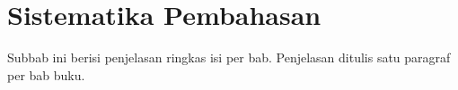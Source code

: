 \section{Sistematika Pembahasan}


Subbab ini berisi penjelasan ringkas isi per bab. Penjelasan ditulis satu paragraf per bab buku.